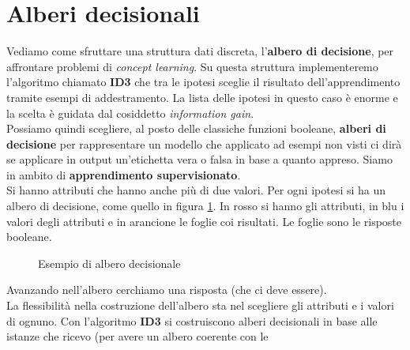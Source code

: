 \documentclass[a4paper,12pt, oneside]{book}
\begin{document}
\section{Alberi decisionali}
Vediamo come sfruttare una struttura dati discreta, l'\textbf{albero di
  decisione}, per affrontare problemi di \textit{concept learning}. Su questa
struttura implementeremo l'algoritmo chiamato \textbf{ID3} che tra le ipotesi
sceglie il risultato dell'apprendimento tramite esempi di addestramento. La
lista delle ipotesi in questo caso è enorme e la scelta è guidata dal cosiddetto
\textit{information gain}.\\
Possiamo quindi scegliere, al posto delle classiche funzioni booleane,
\textbf{alberi di decisione} per rappresentare un modello che applicato ad
esempi non visti ci dirà se applicare in output un'etichetta vera o falsa in
base a quanto appreso. Siamo in ambito di \textbf{apprendimento
  supervisionato}.\\
Si hanno attributi che hanno anche più di due valori. Per ogni ipotesi si ha un
albero di decisione, come quello in figura \ref{dt}. In rosso si hanno gli
attributi, in blu i valori degli attributi e in arancione le foglie coi
risultati. Le foglie sono le risposte booleane.\\
\begin{figure}
  \centering
  \caption{Esempio di albero decisionale}
  \label{dt}
\end{figure}
Avanzando nell'albero cerchiamo una risposta (che ci deve essere).\\
La flessibilità nella costruzione dell'albero sta nel scegliere gli attributi e
i valori di ognuno. Con l'algoritmo \textbf{ID3} si costruiscono alberi
decisionali in base alle istanze che ricevo (per avere un albero coerente con le
\end{document}
